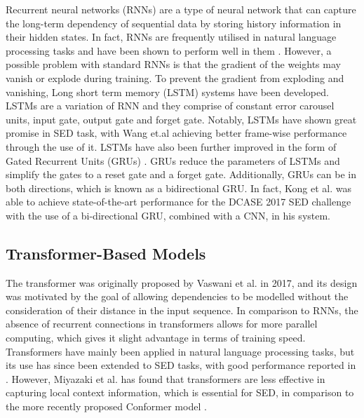 Recurrent neural networks (RNNs) \cite{Mikolov:2010wx} are a type of neural network that can capture the long-term dependency of sequential data by storing history information in their hidden states. In fact, RNNs are frequently utilised in natural language processing tasks and have been shown to perform well in them \cite{devlin2019bert}. However, a possible problem with standard RNNs is that the gradient of the weights may vanish or explode during training. To prevent the gradient from exploding and vanishing, Long short term memory (LSTM) \cite{hochreiter1997long} systems have been developed. LSTMs are a variation of RNN and they comprise of constant error carousel units, input gate, output gate and forget gate. Notably, LSTMs have shown great promise in SED task, with Wang et.al \cite{Wang_2016} achieving better frame-wise performance through the use of it. LSTMs have also been further improved in the form of Gated Recurrent Units (GRUs) \cite{cho2014learning}. GRUs reduce the parameters of LSTMs and simplify the gates to a reset gate and a forget gate. Additionally, GRUs can be in both directions, which is known as a bidirectional GRU. In fact, Kong et al. \cite{kong2020sound} was able to achieve state-of-the-art performance for the DCASE 2017 SED challenge with the use of a bi-directional GRU, combined with a CNN, in his system. 

\subsection{Transformer-Based Models}
The transformer was originally proposed by Vaswani et al. \cite{vaswani2017attention} in 2017, and its design was motivated by the goal of allowing dependencies to be modelled without the consideration of their distance in the input sequence. In comparison to RNNs, the absence of recurrent connections in transformers allows for more parallel computing, which gives it slight advantage in terms of training speed. Transformers have mainly been applied in natural language processing tasks, but its use has since been extended to SED tasks, with good performance reported in \cite{kong2020sound}. However, Miyazaki et al. \cite{Miyazaki2020CONFORMERBASEDSE} has found that transformers are less effective in capturing local context information, which is essential for SED, in comparison to the more recently proposed Conformer model \cite{gulati2020conformer}.\\ 
 
